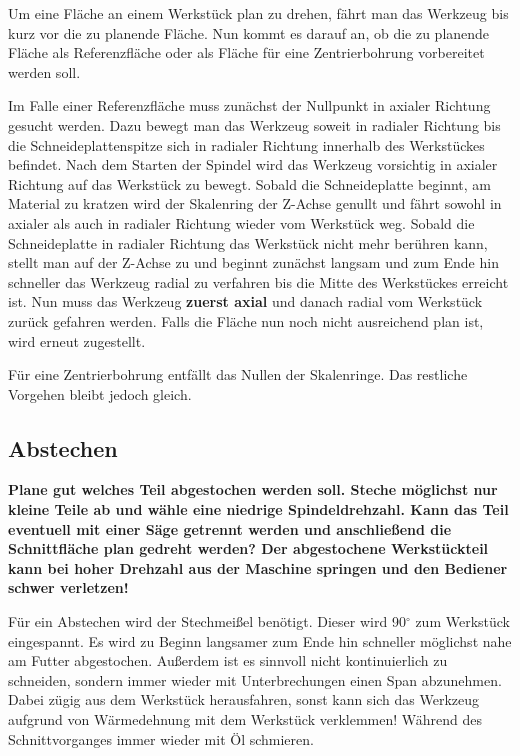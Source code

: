\documentclass{\basedir/fablab-document}
\begin{document}
Um eine Fläche an einem Werkstück plan zu drehen, fährt man das Werkzeug bis kurz vor die zu planende Fläche. Nun kommt es darauf an, ob die zu planende Fläche als Referenzfläche oder als Fläche für eine Zentrierbohrung vorbereitet werden soll. 

Im Falle einer Referenzfläche muss zunächst der Nullpunkt in axialer Richtung gesucht werden.
Dazu bewegt man das Werkzeug soweit in radialer Richtung bis die Schneideplattenspitze sich in radialer Richtung innerhalb des Werkstückes befindet.
Nach dem Starten der Spindel wird das Werkzeug vorsichtig in axialer Richtung auf das Werkstück zu bewegt.
Sobald die Schneideplatte beginnt, am Material zu kratzen wird der Skalenring der Z-Achse genullt und fährt sowohl in axialer als auch in radialer Richtung wieder vom Werkstück weg.
Sobald die Schneideplatte in radialer Richtung das Werkstück nicht mehr berühren kann, stellt man auf der Z-Achse zu und beginnt zunächst langsam und zum Ende hin schneller das Werkzeug radial zu verfahren bis die Mitte des Werkstückes erreicht ist.
Nun muss das Werkzeug \textbf{zuerst axial} und danach radial vom Werkstück zurück gefahren werden.
Falls die Fläche nun noch nicht ausreichend plan ist, wird erneut zugestellt.

Für eine Zentrierbohrung entfällt das Nullen der Skalenringe.
Das restliche Vorgehen bleibt jedoch gleich.

\subsection{Abstechen}

\textbf{Plane gut welches Teil abgestochen werden soll. Steche möglichst nur kleine Teile ab und wähle eine niedrige Spindeldrehzahl. Kann das Teil eventuell mit einer Säge getrennt werden und anschließend die Schnittfläche plan gedreht werden? Der abgestochene Werkstückteil kann bei hoher Drehzahl aus der Maschine springen und den Bediener schwer verletzen!}

Für ein Abstechen wird der Stechmeißel benötigt.
Dieser wird 90$^\circ$ zum Werkstück eingespannt.
Es wird zu Beginn langsamer zum Ende hin schneller möglichst nahe am Futter abgestochen.
Außerdem ist es sinnvoll nicht kontinuierlich zu schneiden, sondern immer wieder mit Unterbrechungen einen Span abzunehmen.
Dabei zügig aus dem Werkstück herausfahren, sonst kann sich das Werkzeug aufgrund von Wärmedehnung mit dem Werkstück verklemmen!
Während des Schnittvorganges immer wieder mit Öl schmieren.
\end{document}
